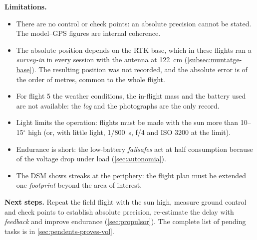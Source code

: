 \textbf{Limitations.}
\begin{itemize}
    \item There are no control or check points: an absolute precision cannot be stated. The model--GPS figures are internal coherence.
    \item The absolute position depends on the RTK base, which in these flights ran a \emph{survey-in} in every session with the antenna at 122~cm (\cref{subsec:muntatge-base}). The resulting position was not recorded, and the absolute error is of the order of metres, common to the whole flight.
    \item For flight 5 the weather conditions, the in-flight mass and the battery used are not available: the \emph{log} and the photographs are the only record.
    \item Light limits the operation: flights must be made with the sun more than 10--15$^{\circ}$ high (or, with little light, 1/800~s, f/4 and ISO 3200 at the limit).
    \item Endurance is short: the low-battery \emph{failsafes} act at half consumption because of the voltage drop under load (\cref{sec:autonomia}).
    \item The DSM shows streaks at the periphery: the flight plan must be extended one \emph{footprint} beyond the area of interest.
\end{itemize}

\textbf{Next steps.} Repeat the field flight with the sun high, measure ground control and check points to establish absolute precision, re-estimate the delay with \emph{feedback} and improve endurance (\cref{sec:propulsor}). The complete list of pending tasks is in \cref{sec:pendents-proves-vol}.

